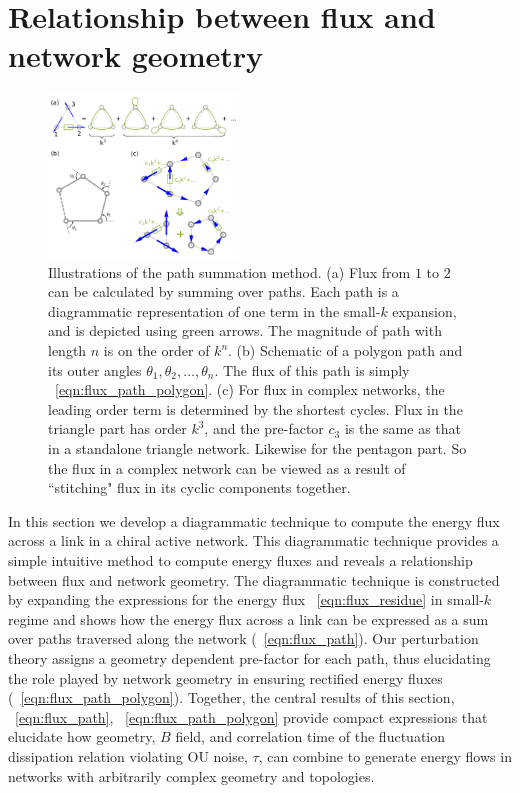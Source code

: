 \documentclass[
 preprint,
 preprintnumbers,
 amsmath,amssymb,
 aps,
 pre,
 longbibliography,
 superscriptaddress,
 10pt, twocolumn
]{revtex4-1}
\begin{document}
\section{Relationship between flux and network geometry} \label{sec:path}
\begin{figure}[ht]
	\centering
	\includegraphics[width=0.45\textwidth]{4_path_sum.pdf}
    \caption{Illustrations of the path summation method.
    (a) Flux from $1$ to $2$ can be calculated by summing over paths. Each path is a diagrammatic representation of one term in the small-$k$ expansion, and is depicted using green arrows. The magnitude of path with length $n$ is on the order of $k^n$.
    (b) Schematic of a polygon path and its outer angles $\theta_1,\theta_2,\dots,\theta_n$. The flux of this path is simply \eqnname~\eqref{eqn:flux_path_polygon}.
    (c) For flux in complex networks, the leading order term is determined by the shortest cycles. Flux in the triangle part has order $k^3$, and the pre-factor $c_3$ is the same as that in a standalone triangle network. Likewise for the pentagon part. So the flux in a complex network can be viewed as a result of ``stitching" flux in its cyclic components together.
    }
    \label{fig:path_sum}
\end{figure}

In this section we develop a diagrammatic technique to compute the energy flux across a link in a chiral active network. This diagrammatic technique provides a simple intuitive method to compute energy fluxes and reveals a relationship between flux and network geometry. The diagrammatic technique is constructed by expanding the expressions for the energy flux \eqnname~\eqref{eqn:flux_residue} in small-$k$ regime and shows how the energy flux across a link can be expressed as a  sum over paths traversed along the network (\eqnname~\eqref{eqn:flux_path}). Our perturbation theory assigns a geometry dependent pre-factor for each path, thus elucidating the role played by network geometry in ensuring rectified energy fluxes (\eqnname~\eqref{eqn:flux_path_polygon}). Together, the central results of this section, \eqnname~\ref{eqn:flux_path}, \eqnname~\ref{eqn:flux_path_polygon} provide compact expressions that elucidate how geometry, $B$ field, and correlation time of the fluctuation dissipation relation violating OU noise, $\tau$, can combine to generate energy flows in networks with arbitrarily complex geometry and topologies.
\end{document}
